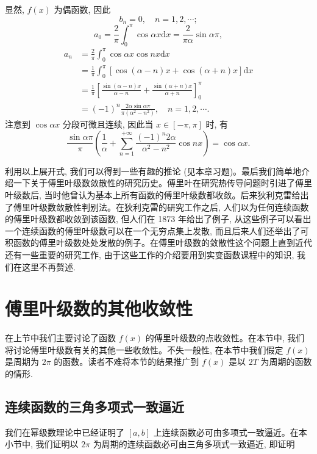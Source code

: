 \begin{solve}
显然, $f(x)$ 为偶函数, 因此
\[
  b_n=0,\quad n=1,2,\cdots;
\]
\[
  a_0=\frac2\pi\int_0^\pi\cos\alpha x\mathrm dx=\frac{2}{\pi\alpha}\sin\alpha\pi,
\]
\[
\begin{aligned}
  a_n
  &=\frac2\pi\int_0^\pi\cos\alpha x\cos nx\mathrm dx\\
  &=\frac1\pi\int_0^\pi[\cos(\alpha-n)x+\cos(\alpha+n)x]\mathrm dx\\
  &=\frac1\pi\left[
    \frac{\sin(\alpha-n)x}{\alpha-n}
    +\frac{\sin(\alpha+n)x}{\alpha+n}
  \right]_0^\pi\\
  &=(-1)^n\frac{2\alpha\sin\alpha\pi}{\pi(\alpha^2-n^2)},\quad n=1,2,\cdots.
\end{aligned}
\]
注意到 $\cos\alpha x$ 分段可微且连续, 因此当 $x\in[-\pi,\pi]$ 时, 有
\[
  \frac{\sin\alpha\pi}{\pi}\left(
    \frac1\alpha+\sum_{n=1}^{+\infty}\frac{(-1)^n2\alpha}{\alpha^2-n^2}\cos nx
  \right)=\cos\alpha x.
\]

利用以上展开式, 我们可以得到一些有趣的推论 (见本章习题)。最后我们简单地介绍一下关于傅里叶级数敛散性的研究历史。傅里叶在研究热传导问题时引进了傅里叶级数后, 当时他曾认为基本上所有函数的傅里叶级数都收敛。后来狄利克雷给出了傅里叶级数敛散性判别法。在狄利克雷的研究工作之后, 人们以为任何连续函数的傅里叶级数都收敛到该函数, 但人们在 1873 年给出了例子, 从这些例子可以看出一个连续函数的傅里叶级数可以在一个无穷点集上发散, 而且后来人们还举出了可积函数的傅里叶级数处处发散的例子。在傅里叶级数的敛散性这个问题上直到近代还有一些重要的研究工作, 由于这些工作的介绍要用到实变函数课程中的知识, 我们在这里不再赘述.
\end{solve}


\section{傅里叶级数的其他收敛性}
\label{sec:ma-12-3}

在上节中我们主要讨论了函数 $f(x)$ 的傅里叶级数的点收敛性。在本节中, 我们将讨论傅里叶级数有关的其他一些收敛性。不失一般性, 在本节中我们假定 $f(x)$ 是周期为 $2\pi$ 的函数。读者不难将本节的结果推广到 $f(x)$ 是以 $2T$ 为周期的函数的情形.

\subsection{连续函数的三角多项式一致逼近}
\label{subsec:ma-12-3-1}

我们在幂级数理论中已经证明了 $[a,b]$ 上连续函数必可由多项式一致逼近。在本小节中, 我们证明以 $2\pi$ 为周期的连续函数必可由三角多项式一致逼近, 即证明

